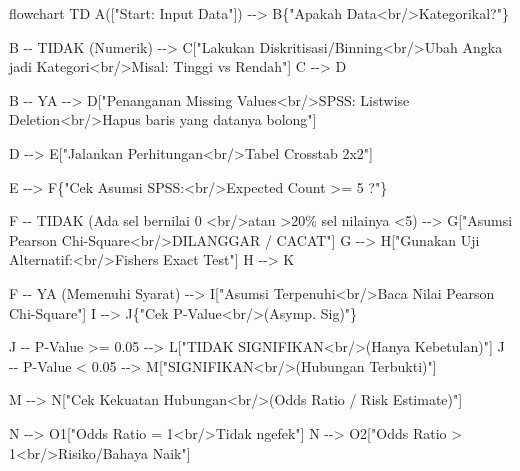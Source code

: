\documentclass[
]{article}
\newenvironment{Shaded}{}{}
\newcommand{\NormalTok}[1]{#1}
\begin{document}
\begin{Shaded}
\begin{Highlighting}[]
\NormalTok{flowchart TD}
\NormalTok{    A(["Start: Input Data"]) {-}{-}\textgreater{} B\{"Apakah Data\textless{}br/\textgreater{}Kategorikal?"\}}
    
\NormalTok{    B {-}{-} TIDAK (Numerik) {-}{-}\textgreater{} C["Lakukan Diskritisasi/Binning\textless{}br/\textgreater{}Ubah Angka jadi Kategori\textless{}br/\textgreater{}Misal: Tinggi vs Rendah"]}
\NormalTok{    C {-}{-}\textgreater{} D}
    
\NormalTok{    B {-}{-} YA {-}{-}\textgreater{} D["Penanganan Missing Values\textless{}br/\textgreater{}SPSS: Listwise Deletion\textless{}br/\textgreater{}Hapus baris yang datanya bolong"]}
    
\NormalTok{    D {-}{-}\textgreater{} E["Jalankan Perhitungan\textless{}br/\textgreater{}Tabel Crosstab 2x2"]}
    
\NormalTok{    E {-}{-}\textgreater{} F\{"Cek Asumsi SPSS:\textless{}br/\textgreater{}Expected Count \textgreater{}= 5 ?"\}}
    
\NormalTok{    F {-}{-} TIDAK (Ada sel bernilai 0 \textless{}br/\textgreater{}atau \textgreater{}20\% sel nilainya \textless{}5) {-}{-}\textgreater{} G["Asumsi Pearson Chi{-}Square\textless{}br/\textgreater{}DILANGGAR / CACAT"]}
\NormalTok{    G {-}{-}\textgreater{} H["Gunakan Uji Alternatif:\textless{}br/\textgreater{}Fisher\textquotesingle{}s Exact Test"]}
\NormalTok{    H {-}{-}\textgreater{} K}
    
\NormalTok{    F {-}{-} YA (Memenuhi Syarat) {-}{-}\textgreater{} I["Asumsi Terpenuhi\textless{}br/\textgreater{}Baca Nilai Pearson Chi{-}Square"]}
\NormalTok{    I {-}{-}\textgreater{} J\{"Cek P{-}Value\textless{}br/\textgreater{}(Asymp. Sig)"\}}
    
\NormalTok{    J {-}{-} P{-}Value \textgreater{}= 0.05 {-}{-}\textgreater{} L["TIDAK SIGNIFIKAN\textless{}br/\textgreater{}(Hanya Kebetulan)"]}
\NormalTok{    J {-}{-} P{-}Value \textless{} 0.05 {-}{-}\textgreater{} M["SIGNIFIKAN\textless{}br/\textgreater{}(Hubungan Terbukti)"]}
    
\NormalTok{    M {-}{-}\textgreater{} N["Cek Kekuatan Hubungan\textless{}br/\textgreater{}(Odds Ratio / Risk Estimate)"]}
    
\NormalTok{    N {-}{-}\textgreater{} O1["Odds Ratio = 1\textless{}br/\textgreater{}Tidak ngefek"]}
\NormalTok{    N {-}{-}\textgreater{} O2["Odds Ratio \textgreater{} 1\textless{}br/\textgreater{}Risiko/Bahaya Naik"]}
    

\end{Highlighting}
\end{Shaded}
\end{document}
